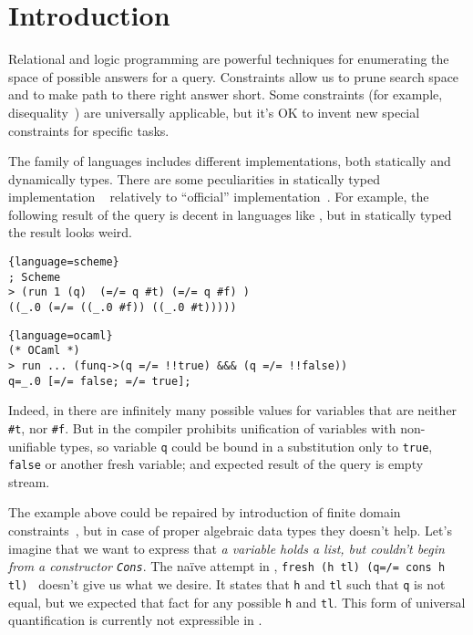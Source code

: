 \section{Introduction}
\label{sec:intro}

Relational and logic programming are powerful techniques for enumerating the space of possible answers for a query. Constraints allow us to prune search space and to make path to there right answer short. Some constraints (for example, disequality~\cite{WillThesis}) are universally applicable, but it's OK to invent new special constraints for specific tasks. 

The \miniKanren{} family of languages includes different implementations, both statically and dynamically types. There are some peculiarities in statically typed implementation \OCanren{}~\cite{ocanren} relatively to ``official'' implementation~\cite{fasterMK}. For example, the following result of the query is decent in languages like 
\Scheme{}, but in statically typed \OCaml{} the result looks weird.

\begin{minipage}{7cm}
\begin{lstlisting}{language=scheme}
; Scheme
> (run 1 (q)  (=/= q #t) (=/= q #f) )
((_.0 (=/= ((_.0 #f)) ((_.0 #t)))))
\end{lstlisting}
\end{minipage}

\begin{minipage}{9.5cm}
\begin{lstlisting}{language=ocaml}
(* OCaml *)
> run ... (funq->(q =/= !!true) &&& (q =/= !!false))
q=_.0 [=/= false; =/= true];
\end{lstlisting}
\end{minipage}

\noindent Indeed, in \Scheme{} there are infinitely many possible values for variables that are neither \lstinline[]=#t=, nor 
\lstinline[]=#f=. But in \OCanren{} the compiler prohibits unification of variables with non-unifiable types, so variable \verb=q= could be bound in a substitution only to \lstinline=true=, \lstinline=false= or another fresh variable; and expected result of the query is empty stream.

The example above could be repaired by introduction of finite domain constraints~\cite{cKanren}, but in case of proper algebraic data types they doesn't help. Let's imagine that we want to express that \emph{a variable holds a list, but couldn't begin from a constructor \lstinline=Cons=}. The na\"{i}ve attempt in \OCanren{}, \lstinline|fresh (h tl) (q=/= cons h tl) | doesn't give us what we desire. It states that  \lstinline|h| and \lstinline|tl| such that \lstinline|q| is not equal, but we expected that fact for any possible \lstinline|h| and \lstinline|tl|. This form of universal quantification is currently not expressible in \OCanren{}.

